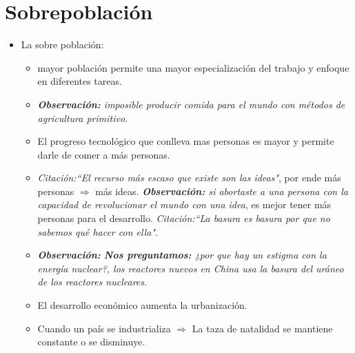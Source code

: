 \section{Sobrepoblación}
\begin{itemize}
    \item La sobre población: 
    \begin{itemize}
        \item mayor población permite una mayor especialización del trabajo y enfoque en diferentes tareas.
        \item \emph{\textbf{Observación: }imposible producir comida para el mundo con métodos de agricultura primitivo.}
        \item El progreso tecnológico que conlleva mas personas es mayor y permite darle de comer a más personas.
        \item \emph{Citación:``El recurso más escaso que existe son las ideas"}, por ende más personas $\Rightarrow$ más ideas. \emph{\textbf{Observación: }si abortaste a una persona con la capacidad de revolucionar el mundo con una idea}, es mejor tener más personas para el desarrollo. \emph{Citación:``La basura es basura por que no sabemos qué hacer con ella"}.
        \item \emph{\textbf{Observación: }\textbf{Nos preguntamos:} ¿por que hay un estigma con la energía nuclear?, los reactores nuevos en China usa la basura del uráneo de los reactores nucleares.}
        \item El desarrollo económico aumenta la urbanización.
        \item Cuando un país se industrializa $\Rightarrow$ La taza de natalidad se mantiene constante o se disminuye.
    \end{itemize}
\end{itemize}

